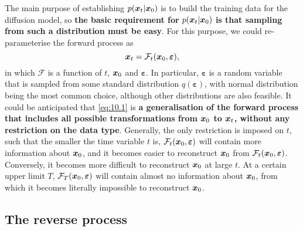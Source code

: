 The main purpose of establishing $p(\bm{x}_{t}|\bm{x}_0)$ is to build the training data for the diffusion model, so \textbf{the basic requirement for} $p(\bm{x}_{t}|\bm{x}_0)$ \textbf{is that sampling from such a distribution must be easy}. For this purpose, we could re-parameterise the forward process as 
\begin{equation}
    \label{eq:10.1}
    \bm{x}_{t}=\mathcal{F}_t(\bm{x}_0,\bm{\varepsilon}),
\end{equation}
in which $\mathcal{F}$ is a function of $t$, $\bm{x}_0$ and $\bm{\varepsilon}$. In particular, $\bm{\varepsilon}$ is a random variable that is sampled from some standard distribution $q(\bm{\varepsilon})$, with normal distribution being the most common choice, although other distributions are also feasible. It could be anticipated that \cref{eq:10.1} is \textbf{a generalisation of the forward process that includes all possible transformations from $\bm{x}_0$ to $\bm{x}_{t}$, without any restriction on the data type}. Generally, the only restriction is imposed on $t$, such that the smaller the time variable $t$ is, $\mathcal{F}_t(\bm{x}_0,\bm{\varepsilon})$ will contain more information about $\bm{x}_0$, and it becomes easier to reconstruct $\bm{x}_0$ from $\mathcal{F}_t(\bm{x}_0,\bm{\varepsilon})$. Conversely, it becomes more difficult to reconstruct $\bm{x}_0$ at large $t$. At a certain upper limit $T$, $\mathcal{F}_T(\bm{x}_0,\bm{\varepsilon})$ will contain almost  no information about $\bm{x}_0$, from which it becomes literally impossible to reconstruct $\bm{x}_0$.

\subsection{The reverse process}

